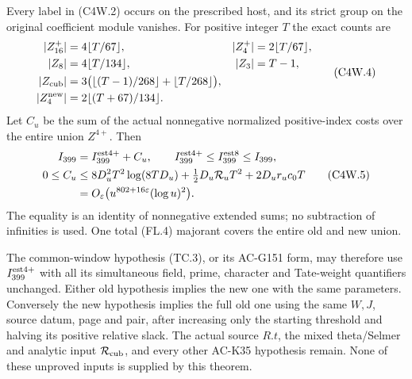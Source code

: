 \begin{theorem}
\label{AC-G153-window}
Every label in (C4W.2) occurs on the prescribed host, and its
strict group on the original coefficient module vanishes.
For positive integer $T$ the exact counts are
\[
 \begin{aligned}
 |Z_{16}^+|&=4\lfloor T/67\rfloor,&
 |Z_4^+|&=2\lfloor T/67\rfloor,\\
 |Z_8|&=4\lfloor T/134\rfloor,& |Z_3|&=T-1,\\
 |Z_{\rm cub}|&=3\bigl(\lfloor(T-1)/268\rfloor
                                +\lfloor T/268\rfloor\bigr),\\
 |Z_4^{\rm new}|&=2\lfloor(T+67)/134\rfloor.
 \end{aligned}
 \tag{C4W.4}
\]
Let $C_u$ be the sum of the actual nonnegative normalized
positive-index costs over the entire union $Z^{4+}$.  Then
\[
 \begin{aligned}
 I_{399}&=I_{399}^{\rm est4+}+C_u,\qquad
 I_{399}^{\rm est4+}\leq I_{399}^{\rm est8}\leq I_{399},\\
 0\leq C_u&\leq8D_u^2T^2\log(8TD_u)
             +\tfrac12D_u\mathcal R_uT^2+2D_ur_uc_0T\\
 &=O_\varepsilon\bigl(u^{802+16\varepsilon}(\log u)^2\bigr).
 \end{aligned}
 \tag{C4W.5}
\]
The equality is an identity of nonnegative extended sums;
no subtraction of infinities is used.  One total (FL.4) majorant
covers the entire old and new union.

The common-window hypothesis (TC.3), or its AC-G151 form, may
therefore use $I_{399}^{\rm est4+}$ with all its simultaneous
field, prime, character and Tate-weight quantifiers unchanged.
Either old hypothesis implies the new one with the same parameters.
Conversely the new hypothesis implies the full old one using the
same $W,J$, source datum, page and pair, after increasing only
the starting threshold and halving its positive relative slack.
The actual source $R.t$, the mixed theta/Selmer and analytic input
$\mathcal R_{\rm cub}$, and every other AC-K35 hypothesis remain.
None of these unproved inputs is supplied by this theorem.
\end{theorem}

